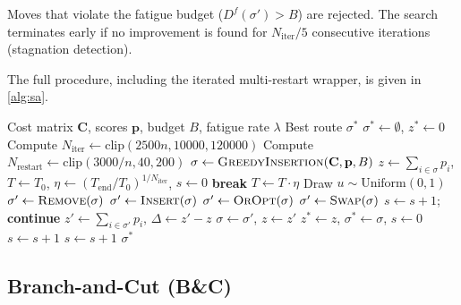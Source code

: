 \documentclass[11pt,a4paper]{article}
\begin{document}
Moves that violate the fatigue budget ($D^f(\sigma') > B$) are rejected.
The search terminates early if no improvement is found for $N_{\text{iter}}/5$ consecutive iterations (stagnation detection).

The full procedure, including the iterated multi-restart wrapper, is given in \cref{alg:sa}.

\begin{algorithm}[H]
\caption{Iterated Simulated Annealing for AOPF}
\label{alg:sa}
\begin{algorithmic}[1]
\Require Cost matrix $\mathbf{C}$, scores $\mathbf{p}$, budget $B$, fatigue rate $\lambda$
\Ensure Best route $\sigma^*$
\State $\sigma^* \gets \emptyset$, $z^* \gets 0$
\State Compute $N_{\text{iter}} \gets \text{clip}(2500n, 10000, 120000)$
\State Compute $N_{\text{restart}} \gets \text{clip}(3000/n, 40, 200)$
  \State $\sigma \gets \textsc{GreedyInsertion}(\mathbf{C}, \mathbf{p}, B)$
  \State $z \gets \sum_{i \in \sigma} p_i$, \; $T \gets T_0$, \; $\eta \gets (T_{\text{end}}/T_0)^{1/N_{\text{iter}}}$, \; $s \gets 0$
     \textbf{break} 
    \EndIf
    \State $T \gets T \cdot \eta$
    \State Draw $u \sim \text{Uniform}(0,1)$
      \State $\sigma' \gets \textsc{Remove}(\sigma)$ 
      \State $\sigma' \gets \textsc{Insert}(\sigma)$ 
      \State $\sigma' \gets \textsc{OrOpt}(\sigma)$ 
    \Else
      \State $\sigma' \gets \textsc{Swap}(\sigma)$ 
    \EndIf
      \State $s \gets s + 1$; \textbf{continue} 
    \EndIf
    \State $z' \gets \sum_{i \in \sigma'} p_i$, \; $\Delta \gets z' - z$
      \State $\sigma \gets \sigma'$, \; $z \gets z'$
       $z^* \gets z$, \; $\sigma^* \gets \sigma$, \; $s \gets 0$
      \Else \; $s \gets s + 1$
      \EndIf
    \Else \; $s \gets s + 1$
    \EndIf
  \EndFor
\EndFor
\State \Return $\sigma^*$
\end{algorithmic}
\end{algorithm}

\subsection{Branch-and-Cut (B\&C)}
\label{sec:bnc}
\end{document}
